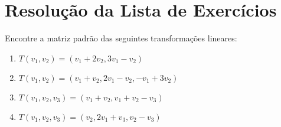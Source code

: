 \chapter{Resolução da Lista de Exercícios}


\begin{question}
  Encontre a matriz padrão das seguintes transformações lineares:
  \begin{enumerate}[label=\alph*)]
    \item $T(v_1, v_2) = (v_1 + 2v_2, 3v_1 - v_2)$
    \item $T(v_1, v_2) = (v_1 + v_2, 2v_1-v_2, -v_1+3v_2)$
    \item $T(v_1, v_2, v_3) = (v_1 + v_2, v_1 + v_2 - v_3)$
    \item $T(v_1, v_2, v_3) = (v_2, 2v_1 + v_3, v_2 - v_3)$
  \end{enumerate}
\end{question}

